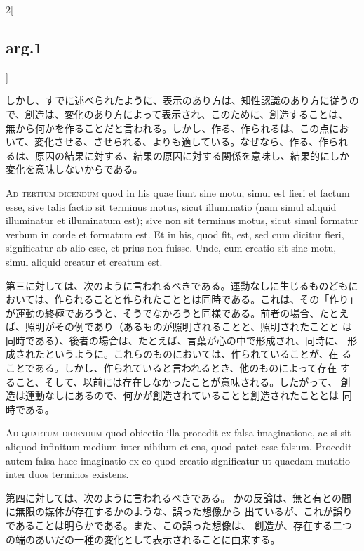 \documentclass[paper=a4paper,fontsize=10pt,jafontsize=9pt,titlepage]{jlreq}
\begin{document}
\begin{paracol}{2}[\subsection{arg.1}]
\switchcolumn

しかし、すでに述べられたように、表示のあり方は、知性認識のあり方に従うの
 で、創造は、変化のあり方によって表示され、このために、創造することは、
 無から何かを作ることだと言われる。しかし、作る、作られるは、この点にお
 いて、変化させる、させられる、よりも適している。なぜなら、作る、作られ
 るは、原因の結果に対する、結果の原因に対する関係を意味し、結果的にしか
 変化を意味しないからである。

\switchcolumn*[\subsection{ad.3}]

{\scshape Ad tertium dicendum} quod in his quae fiunt sine motu, simul est fieri et
 factum esse, sive talis factio sit terminus motus, sicut illuminatio
 (nam simul aliquid illuminatur et illuminatum est); sive non sit
 terminus motus, sicut simul formatur verbum in corde et formatum
 est. Et in his, quod fit, est, sed cum dicitur fieri, significatur ab
 alio esse, et prius non fuisse. Unde, cum creatio sit sine motu, simul
 aliquid creatur et creatum est.

\switchcolumn

第三に対しては、次のように言われるべきである。運動なしに生じるものどもに
 おいては、作られることと作られたこととは同時である。これは、その「作り」
 が運動の終極であろうと、そうでなかろうと同様である。前者の場合、たとえ
 ば、照明がその例であり（あるものが照明されることと、照明されたことと
 は同時である）、後者の場合は、たとえば、言葉が心の中で形成され、同時に、
 形成されたというように。これらのものにおいては、作られていることが、在
 ることである。しかし、作られていると言われるとき、他のものによって存在
 すること、そして、以前には存在しなかったことが意味される。したがって、
 創造は運動なしにあるので、何かが創造されていることと創造されたこととは
 同時である。

\switchcolumn*[\subsection{ad.4}]

{\scshape Ad quartum dicendum} quod obiectio illa procedit ex falsa imaginatione,
 ac si sit aliquod infinitum medium inter nihilum et ens, quod patet
 esse falsum. Procedit autem falsa haec imaginatio ex eo quod creatio
 significatur ut quaedam mutatio inter duos terminos existens.

\switchcolumn

第四に対しては、次のように言われるべきである。
かの反論は、無と有との間に無限の媒体が存在するかのような、誤った想像から
 出ているが、これが誤りであることは明らかである。また、この誤った想像は、
 創造が、存在する二つの端のあいだの一種の変化として表示されることに由来する。

\end{paracol}
\end{document}

